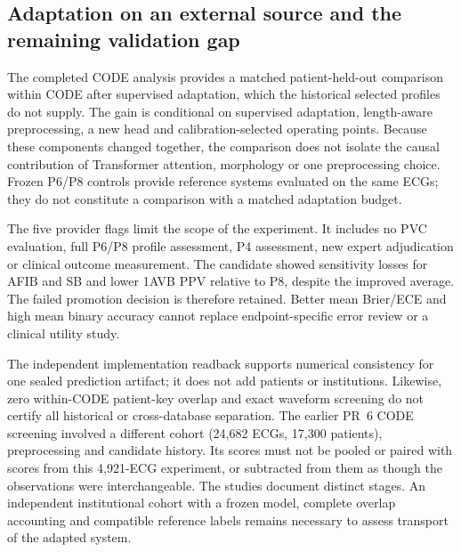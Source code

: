 \subsection{Adaptation on an external source and the remaining validation gap}
\label{sec:code-discussion}
The completed CODE analysis provides a matched patient-held-out comparison within CODE after supervised adaptation, which the historical selected profiles do not supply. The gain is conditional on supervised adaptation, length-aware preprocessing, a new head and calibration-selected operating points. Because these components changed together, the comparison does not isolate the causal contribution of Transformer attention, morphology or one preprocessing choice. Frozen P6/P8 controls provide reference systems evaluated on the same ECGs; they do not constitute a comparison with a matched adaptation budget.

The five provider flags limit the scope of the experiment. It includes no PVC evaluation, full P6/P8 profile assessment, P4 assessment, new expert adjudication or clinical outcome measurement. The candidate showed sensitivity losses for AFIB and SB and lower 1AVB PPV relative to P8, despite the improved average. The failed promotion decision is therefore retained. Better mean Brier/ECE and high mean binary accuracy cannot replace endpoint-specific error review or a clinical utility study.

The independent implementation readback supports numerical consistency for one sealed prediction artifact; it does not add patients or institutions. Likewise, zero within-CODE patient-key overlap and exact waveform screening do not certify all historical or cross-database separation. The earlier PR~6 CODE screening involved a different cohort (24,682 ECGs, 17,300 patients), preprocessing and candidate history. Its scores must not be pooled or paired with scores from this 4,921-ECG experiment, or subtracted from them as though the observations were interchangeable. The studies document distinct stages. An independent institutional cohort with a frozen model, complete overlap accounting and compatible reference labels remains necessary to assess transport of the adapted system.
